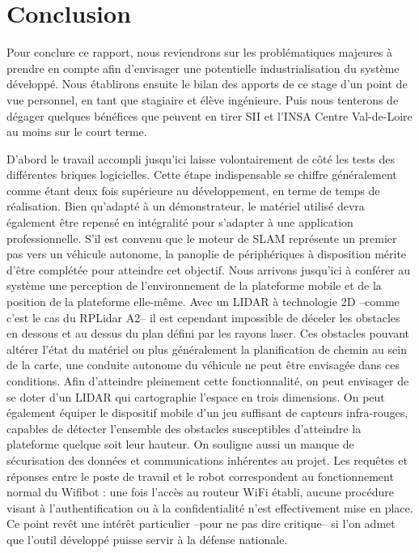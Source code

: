 \chapter*{Conclusion}

Pour conclure ce rapport, nous reviendrons sur les problématiques majeures à prendre en compte afin d'envisager une potentielle industrialisation du système développé. 
Nous établirons ensuite le bilan des apports de ce stage d'un point de vue personnel, en tant que stagiaire et élève ingénieure. 
Puis nous tenterons de dégager quelques bénéfices que peuvent en tirer SII et l'INSA Centre Val-de-Loire au moins sur le court terme.

D'abord le travail accompli jusqu'ici laisse volontairement de côté les tests des différentes briques logicielles.  
Cette étape indispensable se chiffre généralement comme étant deux fois supérieure au développement, en terme de temps de réalisation.
Bien qu'adapté à un démonstrateur, le matériel utilisé devra également être repensé en intégralité pour s'adapter à une application professionnelle. 
S'il est convenu que le moteur de SLAM représente un premier pas vers un véhicule autonome, la panoplie de périphériques à disposition mérite d'être complétée pour atteindre cet objectif.
Nous arrivons jusqu'ici à conférer au système une perception de l'environnement de la plateforme mobile et de la position de la plateforme elle-même.    
Avec un LIDAR à technologie 2D --comme c'est le cas du RPLidar A2-- il est cependant impossible de déceler les obstacles en dessous et au dessus du plan défini par les rayons laser. 
Ces obstacles pouvant altérer l'état du matériel ou plus généralement la planification de chemin au sein de la carte, une conduite autonome du véhicule ne peut être envisagée dans ces conditions.   
Afin d'atteindre pleinement cette fonctionnalité, on peut envisager de se doter d'un LIDAR qui cartographie l'espace en trois dimensions. 
On peut également équiper le dispositif mobile d'un jeu suffisant de capteurs infra-rouges, capables de détecter l'ensemble des obstacles susceptibles d'atteindre la plateforme quelque soit leur hauteur. 
On souligne aussi un manque de sécurisation des données et communications inhérentes au projet. 
Les requêtes et réponses entre le poste de travail et le robot correspondent au fonctionnement normal du Wifibot :
une fois l'accès au routeur WiFi établi, aucune procédure visant à l'authentification ou à la confidentialité n'est effectivement mise en place.
Ce point revêt une intérêt particulier --pour ne pas dire critique-- si l'on admet que l'outil développé puisse servir à la défense nationale. 

